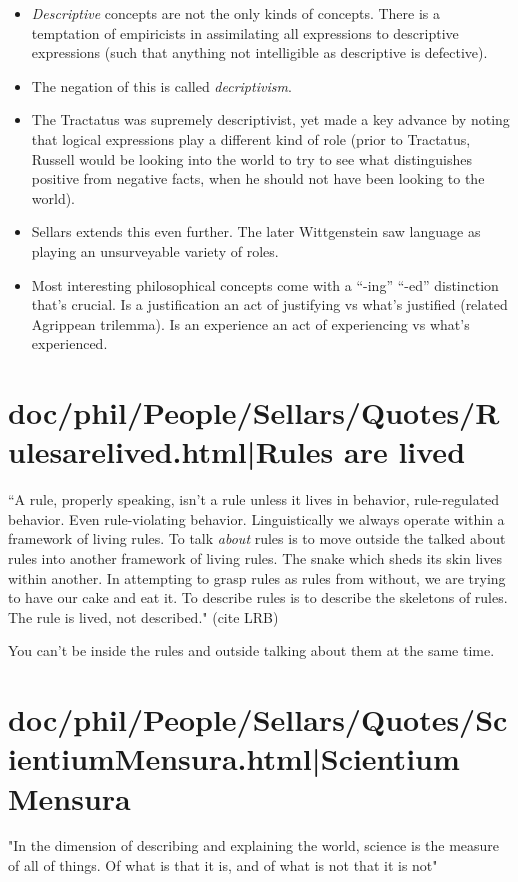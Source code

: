 \documentclass[12pt,a4paper]{report}
\begin{document}
\begin{itemize}
    \item \emph{Descriptive} concepts are not the only kinds of concepts. There
         is a temptation of empiricists in assimilating all expressions to
         descriptive expressions (such that anything not intelligible as
         descriptive is defective).
    \item The negation of this is called \emph{decriptivism}.
    \item The Tractatus was supremely descriptivist, yet made a key advance by
        noting that logical expressions play a different kind of role (prior to
        Tractatus, Russell would be looking into the world to try to see what
        distinguishes positive from negative facts, when he should not have
        been looking to the world).
    \item Sellars extends this even further. The later Wittgenstein saw
        language as playing an unsurveyable variety of roles.
    \item Most interesting philosophical concepts come with a ``-ing'' ``-ed''
        distinction that's crucial. Is a justification an act of justifying vs
        what's justified (related Agrippean trilemma). Is an experience an act
        of experiencing vs what's experienced.
\end{itemize}
\section{doc/phil/People/Sellars/Quotes/Rulesarelived.html|Rules are lived}
``A rule, properly speaking, isn't a rule unless it lives in behavior,
rule-regulated behavior. Even rule-violating behavior. Linguistically we always
operate within a framework of living rules. To talk \emph{about} rules is to
move outside the talked about rules into another framework of living rules. The
snake which sheds its skin lives within another. In attempting to grasp rules as
rules from without, we are trying to have our cake and eat it. To describe rules
is to describe the skeletons of rules. The rule is lived, not described."
(cite LRB)

You can't be inside the rules and outside talking about them at the same time.

\section{doc/phil/People/Sellars/Quotes/ScientiumMensura.html|Scientium Mensura}
"In the dimension of describing and explaining the world, science is the measure
of all of things. Of what is that it is, and of what is not that it is not"
\end{document}
